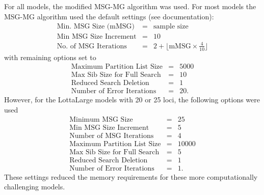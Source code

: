 \documentclass[twoside,10pt,twocolumn]{article}
\begin{document}
For all models, the modified MSG-MG algorithm was used. For most models the MSG-MG algorithm used the 
default settings (see documentation): 
\begin{eqnarray*}
\mbox{Min.~MSG Size (mMSG)} &=& \mbox{sample size} \\
\mbox{Min MSG Size Increment} &=&  10  \\
\mbox{No. of MSG Iterations} &=& 
 2 + \lfloor\mbox{mMSG} \times \frac{4}{10}\rfloor  
\end{eqnarray*}
with remaining options set to
\begin{eqnarray*}
\mbox{Maximum Partition List Size} & = & 5000 \\
\mbox{Max Sib Size for Full Search} & = & 10 \\
\mbox{Reduced Search Deletion} & = & 1 \\
\mbox{Number of Error Iterations} & = & 20.
\end{eqnarray*}
However, for the LottaLarge models with 20 or 25 loci, the following options were used
\begin{eqnarray*}
\mbox{Minimum MSG Size} & = & 25 \\
\mbox{Min MSG Size Increment} & = & 5 \\
\mbox{Number of MSG Iterations} & = & 4 \\
\mbox{Maximum Partition List Size} & = & 10000 \\
\mbox{Max Sib Size for Full Search} & = & 5 \\
\mbox{Reduced Search Deletion} & = & 1 \\
\mbox{Number of Error Iterations} & = & 1.
\end{eqnarray*}
These settings reduced the memory requirements for these more computationally challenging models. 
\end{document}
